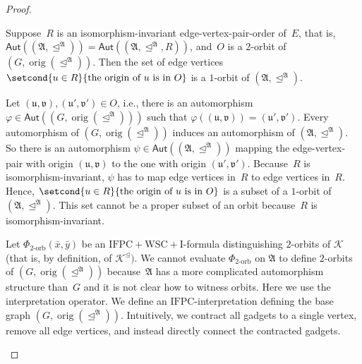 \documentclass[]{lmcs}
\renewcommand{\phi}{\varphi}
\newcommand{\formA}{\Phi}
\newcommand{\autoA}{\phi}
\newcommand{\autoB}{\psi}
\newcommand{\autGroup}[1]{\mathsf{Aut}(#1)}
\newcommand{\tup}[1]{\bar{#1}}
\newcommand{\Struct}{\mathfrak{A}}
\newcommand{\vertA}{u}
\newcommand{\StructA}{\mathfrak{A}}
\newcommand{\GraphClass}{\mathcal{K}}
\newcommand{\IFPC}{\ensuremath{\mathrm{IFPC}}}
\newcommand{\IFPCWSCI}{\ensuremath{\mathrm{IFPC{+}WSC{+}I}}}
\newcommand{\orig}[1]{\operatorname{orig}(#1)}
\newcommand{\bVertA}{\mathfrak{u}}
\newcommand{\bVertB}{\mathfrak{v}}
\newcommand{\indRel}{\trianglelefteq}
\newcommand{\indClosure}[1]{#1^\indRel}
\newenvironment{claimproof}[1][\proofname]{\begin{claimprooftemp}[#1]\renewcommand*{\qedsymbol}{\(\dashv\)}}{\end{claimprooftemp}}
\begin{document}
\begin{proof}
	\begin{clm}
		\label{clm:orbit-no-cycle}
		Suppose~$R$ is an isomorphism-invariant edge-vertex-pair-order of~$E$,
		that is, $\autGroup{(\StructA,\indRel^\Struct)} = \autGroup{(\StructA,\indRel^\Struct, R)}$,
		and~$O$ is a $2$-orbit of $(G, \orig{\indRel^\Struct})$.
		Then the set of edge vertices
		$\setcond{\vertA \in R}{\text{the origin of } \vertA \text{ is in } O}$
		is a $1$-orbit of $(\StructA,\indRel^\Struct)$.
	\end{clm}
	\begin{claimproof}
		Let $(\bVertA,\bVertB),(\bVertA',\bVertB') \in O$,
		i.e., there is an automorphism $\autoA \in \autGroup{(G, \orig{\indRel^\Struct})}$
		such that $\autoA((\bVertA,\bVertB)) = (\bVertA',\bVertB')$.
		Every automorphism of $(G, \orig{\indRel^\Struct})$ induces an automorphism of $(\StructA, \indRel^\Struct)$.
		So there is an automorphism $\autoB \in \autGroup{(\StructA, \indRel^\Struct)}$ mapping the edge-vertex-pair with origin $(\bVertA,\bVertB)$
		to the one with origin $(\bVertA',\bVertB')$.
		Because~$R$ is isomorphism-invariant,
		$\autoB$ has to map edge vertices in~$R$ to edge vertices in~$R$.
		Hence, $\setcond{\vertA \in R}{\text{the origin of } \vertA \text{ is in } O}$
		is a subset of a $1$-orbit of $(\StructA,\indRel^\Struct)$.
		This set cannot be a proper subset of an orbit because~$R$ is isomorphism-invariant.
	\end{claimproof}


	Let $\formA_{2\text{-orb}}(\tup{x},\tup{y})$ be an $\IFPCWSCI$-formula distinguishing $2$-orbits of $\GraphClass$
	(that is, by definition, of $\indClosure{\GraphClass})$.
	We cannot evaluate $\formA_{2\text{-orb}}$ on $\StructA$
	to define $2$-orbits of $(G, \orig{\indRel^\Struct})$
	because~$\StructA$ has a more complicated automorphism structure
	than~$G$ and it is not clear how to witness orbits.
	Here we use the interpretation operator.
	We define an \IFPC{}-interpretation defining the base graph $(G, \orig{\indRel ^\Struct})$.
	Intuitively, we contract all gadgets to a single vertex,
	remove all edge vertices,
	and instead directly connect the contracted gadgets.
	
	\begin{figure}
		\centering
\end{figure}
\end{proof}
\end{document}
